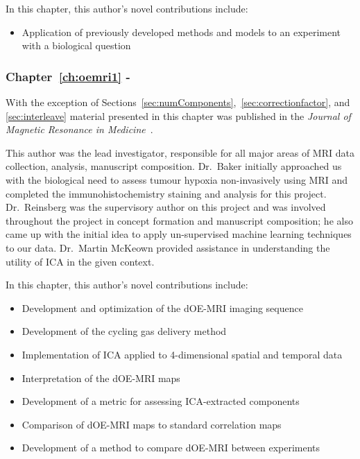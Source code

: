 In this chapter, this author's novel contributions include:

\begin{itemize}
\item Application of previously developed methods and models to an experiment with a biological question
\end{itemize}

\subsubsection{Chapter~\ref{ch:oemri1} - }

With the exception of Sections~\ref{sec:numComponents},~\ref{sec:correctionfactor}, and \ref{sec:interleave} material presented in this chapter was published in the \textit{Journal of Magnetic Resonance in Medicine}~\cite{Moosvi:2018ca}. 

This author was the lead investigator, responsible for all major areas of MRI data collection, analysis, manuscript composition. 
Dr.\ Baker initially approached us with the biological need to assess tumour hypoxia non-invasively using MRI and completed the immunohistochemistry staining and analysis for this project. 
Dr.\ Reinsberg was the supervisory author on this project and was involved throughout the project in concept formation and manuscript composition; he also came up with the initial idea to apply un-supervised machine learning techniques to our data. 
Dr.\ Martin McKeown provided assistance in understanding the utility of \acs{ICA} in the given context. 

In this chapter, this author's novel contributions include:

\begin{itemize}
\item Development and optimization of the \acs{dOE-MRI} imaging sequence
\item Development of the cycling gas delivery method
\item Implementation of \acs{ICA} applied to 4-dimensional spatial and temporal data
\item Interpretation of the \acs{dOE-MRI} maps
\item Development of a metric for assessing ICA-extracted components
\item Comparison of \acs{dOE-MRI} maps to standard correlation maps
\item Development of a method to compare \acs{dOE-MRI} between experiments
\end{itemize}

